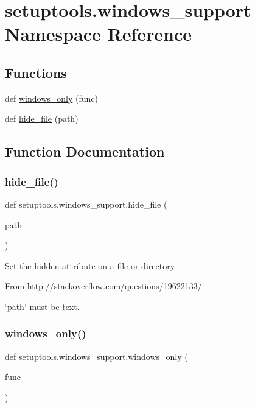 \hypertarget{namespacesetuptools_1_1windows__support}{}\section{setuptools.\+windows\+\_\+support Namespace Reference}
\label{namespacesetuptools_1_1windows__support}
\subsection*{Functions}
\begin{DoxyCompactItemize}
\item 
def \hyperlink{namespacesetuptools_1_1windows__support_a2cb3d8ebd26448a87d18595fe56b92c8}{windows\+\_\+only} (func)
\item 
def \hyperlink{namespacesetuptools_1_1windows__support_abd52492d8f2879fc041e17badfbe02f7}{hide\+\_\+file} (path)
\end{DoxyCompactItemize}


\subsection{Function Documentation}
\mbox{\label{namespacesetuptools_1_1windows__support_abd52492d8f2879fc041e17badfbe02f7}} 
\subsubsection{\texorpdfstring{hide\+\_\+file()}{hide\_file()}}
{\footnotesize\ttfamily def setuptools.\+windows\+\_\+support.\+hide\+\_\+file (\begin{DoxyParamCaption}\item[{}]{path }\end{DoxyParamCaption})}

\begin{DoxyVerb}Set the hidden attribute on a file or directory.

From http://stackoverflow.com/questions/19622133/

`path` must be text.
\end{DoxyVerb}
 \mbox{\label{namespacesetuptools_1_1windows__support_a2cb3d8ebd26448a87d18595fe56b92c8}} 
\subsubsection{\texorpdfstring{windows\+\_\+only()}{windows\_only()}}
{\footnotesize\ttfamily def setuptools.\+windows\+\_\+support.\+windows\+\_\+only (\begin{DoxyParamCaption}\item[{}]{func }\end{DoxyParamCaption})}

